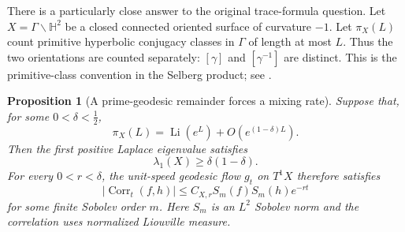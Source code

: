 \documentclass[11pt,a4paper]{article}
\numberwithin{equation}{section}
\newtheorem{proposition}[theorem]{Proposition}
\theoremstyle{definition}
\theoremstyle{remark}
\begin{document}
There is a particularly close answer to the original trace-formula
question. Let $X=\Gamma\backslash\mathbb H^2$ be a closed connected
oriented surface of curvature $-1$. Let $\pi_X(L)$ count primitive
hyperbolic conjugacy classes in $\Gamma$ of length at most $L$.
Thus the two orientations are counted separately: $[\gamma]$ and
$[\gamma^{-1}]$ are distinct. This is the primitive-class convention
in the Selberg product; see \cite[Section~2.1]{PollicottSharpZeta}.

\begin{proposition}[A prime-geodesic remainder forces a mixing rate]
\label{prop:countmixselberg}
Suppose that, for some $0<\delta<\tfrac12$,
\begin{equation}
 \pi_X(L)=\operatorname{Li}(e^L)+O(e^{(1-\delta)L}).
 \label{eq:countmixselbergcount}
\end{equation}
Then the first positive Laplace eigenvalue satisfies
\begin{equation}
 \lambda_1(X)\geq\delta(1-\delta).
 \label{eq:countmixselberggap}
\end{equation}
For every $0<r<\delta$, the unit-speed geodesic flow $g_t$ on $T^1X$
therefore satisfies
\begin{equation}
 |\operatorname{Corr}_t(f,h)|
 \leq C_{X,r}S_m(f)S_m(h)e^{-rt}
 \label{eq:countmixselbergmixing}
\end{equation}
for some finite Sobolev order $m$. Here $S_m$ is an $L^2$ Sobolev norm
and the correlation uses normalized Liouville measure.
\end{proposition}
\end{document}
